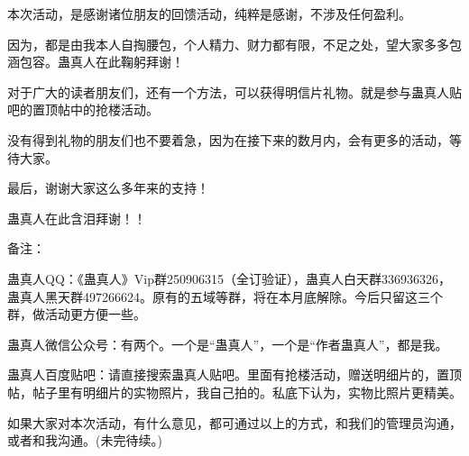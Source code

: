 \begin{this_body}
本次活动，是感谢诸位朋友的回馈活动，纯粹是感谢，不涉及任何盈利。

因为，都是由我本人自掏腰包，个人精力、财力都有限，不足之处，望大家多多包涵包容。蛊真人在此鞠躬拜谢！

对于广大的读者朋友们，还有一个方法，可以获得明信片礼物。就是参与蛊真人贴吧的置顶帖中的抢楼活动。

没有得到礼物的朋友们也不要着急，因为在接下来的数月内，会有更多的活动，等待大家。

最后，谢谢大家这么多年来的支持！

蛊真人在此含泪拜谢！！

备注：

蛊真人QQ：《蛊真人》Vip群250906315（全订验证），蛊真人白天群336936326，蛊真人黑天群497266624。原有的五域等群，将在本月底解除。今后只留这三个群，做活动更方便一些。

蛊真人微信公众号：有两个。一个是“蛊真人”，一个是“作者蛊真人”，都是我。

蛊真人百度贴吧：请直接搜索蛊真人贴吧。里面有抢楼活动，赠送明细片的，置顶帖，帖子里有明细片的实物照片，我自己拍的。私底下认为，实物比照片更精美。

如果大家对本次活动，有什么意见，都可通过以上的方式，和我们的管理员沟通，或者和我沟通。(未完待续。)

\end{this_body}

